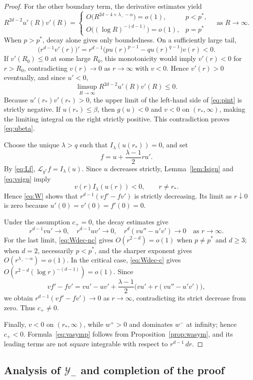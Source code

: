 \documentclass[12pt, a4paper, reqno]{amsart}
\numberwithin{equation}{section}
\theoremstyle{definition}
\theoremstyle{remark}
\begin{document}
\begin{proof}
For the other boundary term, the derivative estimates yield
\[
  R^{2d-2}u'(R)v'(R)
  =\begin{cases}
    O\bigl(R^{2d-4+\lambda_--\alpha}\bigr)=o(1),
      &p<p^*,\\[2pt]
    O\bigl((\log R)^{-(d-1)}\bigr)=o(1),
      &p=p^*
  \end{cases}
  \quad\text{as }R\to\infty.
\]
When $p>p^*$, decay alone gives only boundedness. On a sufficiently large
tail,
\[
  \bigl(r^{d-1}v'(r)\bigr)'
  =r^{d-1}\bigl(pu(r)^{p-1}-qu(r)^{q-1}\bigr)v(r)<0.
\]
If $v'(R_0)\le0$ at some large $R_0$, this monotonicity would imply
$v'(r)<0$ for $r>R_0$, contradicting $v(r)\to0$ as $r\to\infty$
with $v<0$. Hence
$v'(r)>0$ eventually, and since $u'<0$,
\[
  \limsup_{R\to\infty}R^{2d-2}u'(R)v'(R)\le0.
\]
Because $u'(r_*)v'(r_*)>0$, the upper limit of the left-hand side of
\eqref{eq:pint} is strictly negative. If $u(r_*)\le\beta$, then
$g(u)<0$ and $v<0$ on $(r_*,\infty)$, making the limiting integral on the
right strictly positive. This contradiction proves \eqref{eq:ubeta}.

Choose the unique $\lambda>q$ such that $I_\lambda(u(r_*))=0$, and set
\[
  f=u+\frac{\lambda-1}{2}ru'.
\]
By \eqref{eq:Lf}, $\mathcal L_{y^*}f=I_\lambda(u)$. Since $u$ decreases
strictly, Lemma~\ref{lem:Isign} and \eqref{eq:vsign} imply
\[
  v(r)I_\lambda(u(r))<0,
  \qquad r\ne r_*.
\]
Hence \eqref{eq:W} shows that $r^{d-1}(vf'-fv')$ is strictly decreasing.
Its limit as $r\downarrow0$ is zero because
$u'(0)=v'(0)=f'(0)=0$.

Under the assumption $c_+=0$, the decay estimates give
\[
  r^{d-1}vu'\to0,
  \quad
  r^{d-1}uv'\to0,
  \quad
  r^d(vu''-u'v')\to0
  \quad\text{as }r\to\infty.
\]
For the last limit, \eqref{eq:Wdec-nc} gives
$O(r^{2-d})=o(1)$ when $p\ne p^*$ and $d\ge3$; when $d=2$,
necessarily $p<p^*$, and the sharper exponent gives
$O(r^{\lambda_--\alpha})=o(1)$. In the critical case,
\eqref{eq:Wdec-c} gives
$O(r^{2-d}(\log r)^{-(d-1)})=o(1)$. Since
\[
  vf'-fv'
  =vu'-uv'+\frac{\lambda-1}{2}
    \bigl(vu'+r(vu''-u'v')\bigr),
\]
we obtain $r^{d-1}(vf'-fv')\to0$ as $r\to\infty$, contradicting its
strict decrease from zero. Thus $c_+\ne0$.

Finally, $v<0$ on $(r_*,\infty)$, while $w^+>0$ and dominates $w^-$ at
infinity; hence $c_+<0$. Formula~\eqref{eq:vasymp} follows from
Proposition~\ref{prop:wasym}, and its leading terms are not square
integrable with respect to $r^{d-1}\,dr$.
\end{proof}

\subsection{\texorpdfstring{Analysis of $\mathcal Y_-$ and completion of the proof}{Analysis of Y-minus and completion of the proof}}
\end{document}
